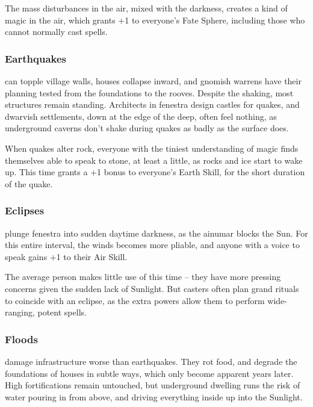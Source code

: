 \begin{multicols}{2}
The mass disturbances in the air, mixed with the darkness, creates a kind of magic in the air, which grants +1 to everyone's Fate Sphere, including those who cannot normally cast spells.

\subsubsection{Earthquakes}
can topple \gls{village} walls, houses collapse inward, and gnomish warrens have their planning tested from the foundations to the rooves.
Despite the shaking, most structures remain standing.
Architects in \gls{fenestra} design castles for quakes, and dwarvish settlements, down at the edge of the \gls{deep}, often feel nothing, as underground caverns don't shake during quakes as badly as the surface does.

When quakes alter rock, everyone with the tiniest understanding of magic finds themselves able to speak to stone, at least a little, as rocks and ice start to wake up.
This time grants a +1 bonus to everyone's Earth Skill, for the short duration of the quake.

\subsubsection{Eclipses}
plunge \gls{fenestra} into sudden daytime darkness, as the \gls{ainumar} blocks the Sun.
For this entire \gls{interval}, the winds becomes more pliable, and anyone with a voice to speak gains +1 to their Air Skill.

The average person makes little use of this time -- they have more pressing concerns given the sudden lack of Sunlight.
But casters often plan grand rituals to coincide with an eclipse, as the extra powers allow them to perform wide-ranging, potent spells.

\subsubsection{Floods}
damage infrastructure worse than earthquakes.
They rot food, and degrade the foundations of houses in subtle ways, which only become apparent years later.
High fortifications remain untouched, but underground dwelling runs the risk of water pouring in from above, and driving everything inside up into the Sunlight.


\end{multicols}
